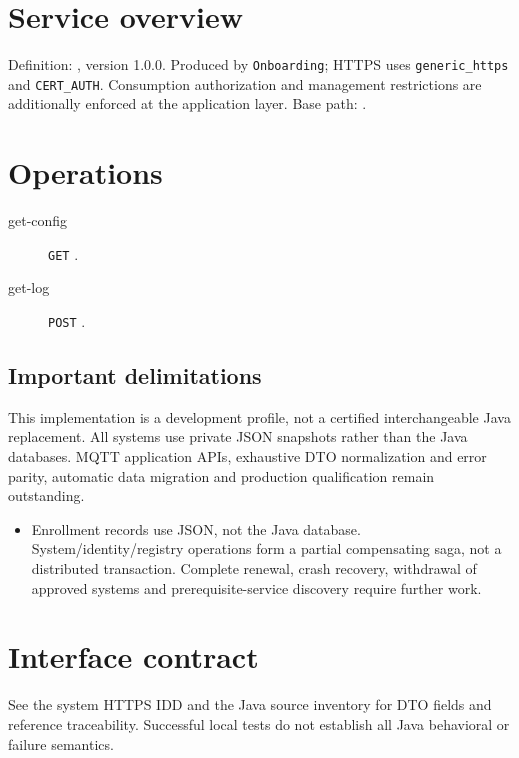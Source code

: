 \documentclass[a4paper]{arrowhead}
\begin{document}
\ArrowheadSetup
\section{Service overview}
Definition: , version 1.0.0. Produced by \texttt{Onboarding}; HTTPS uses \texttt{generic\_https} and \texttt{CERT\_AUTH}. Consumption authorization and management restrictions are additionally enforced at the application layer. Base path: .
\section{Operations}
\begin{description}
\item[get-config] \texttt{GET} .
\item[get-log] \texttt{POST} .
\end{description}
\subsection{Important delimitations}
This implementation is a development profile, not a certified interchangeable Java replacement. All systems use private JSON snapshots rather than the Java databases. MQTT application APIs, exhaustive DTO normalization and error parity, automatic data migration and production qualification remain outstanding.
\begin{itemize}
\item Enrollment records use JSON, not the Java database. System/identity/registry operations form a partial compensating saga, not a distributed transaction. Complete renewal, crash recovery, withdrawal of approved systems and prerequisite-service discovery require further work.
\end{itemize}
\section{Interface contract}
See the system HTTPS IDD and the Java source inventory for DTO fields and reference traceability. Successful local tests do not establish all Java behavioral or failure semantics.
\end{document}
